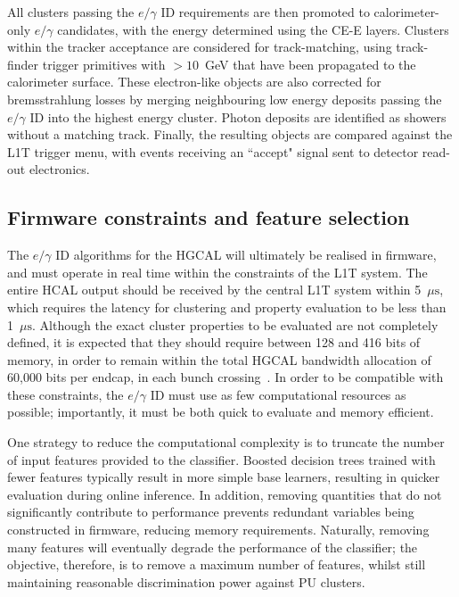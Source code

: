 All clusters passing the $e/\gamma$ ID requirements are then promoted to calorimeter-only $e/\gamma$ candidates, with the energy determined using the CE-E layers. Clusters within the tracker acceptance are considered for track-matching, using track-finder trigger primitives with \pt$>10$~GeV that have been propagated to the calorimeter surface. These electron-like objects are also corrected for bremsstrahlung losses by merging neighbouring low energy deposits passing the $e/\gamma$ ID into the highest energy cluster. Photon deposits are identified as showers without a matching track. Finally, the resulting objects are compared against the L1T trigger menu, with events receiving an ``accept" signal sent to detector read-out electronics.

\subsection{Firmware constraints and feature selection}
\label{subsec:feature_selection}

The $e/\gamma$ ID algorithms for the HGCAL will ultimately be realised in firmware, and must operate in real time within the constraints of the L1T system. The entire HCAL output should be received by the central L1T system within 5~$\mu\mathrm{s}$, which requires the latency for clustering and property evaluation to be less than 1~$\mu\mathrm{s}$. Although the exact cluster properties to be evaluated are not completely defined, it is expected that they should require between 128 and 416 bits of memory, in order to remain within the total HGCAL bandwidth allocation of 60,000 bits per endcap, in each bunch crossing~\cite{CMS_phase2_HGCAL}. In order to be compatible with these constraints, the $e/\gamma$ ID must use as few computational resources as possible; importantly, it must be both quick to evaluate and memory efficient. %

One strategy to reduce the computational complexity is to truncate the number of input features provided to the classifier. Boosted decision trees trained with fewer features typically result in more simple base learners, resulting in quicker evaluation during online inference. In addition, removing quantities that do not significantly contribute to performance prevents redundant variables being constructed in firmware, reducing memory requirements. Naturally, removing many features will eventually degrade the performance of the classifier; the objective, therefore, is to remove a maximum number of features, whilst still maintaining reasonable discrimination power against PU clusters. 

